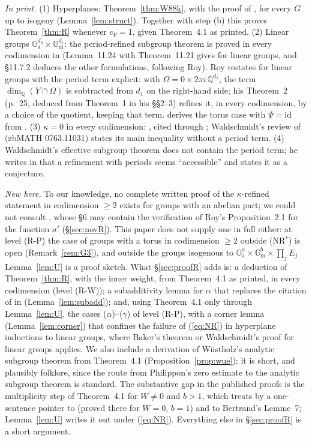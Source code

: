 \documentclass[11pt]{amsart}
\theoremstyle{definition}
\newcommand{\Q}{\mathbb{Q}}
\newcommand{\Ga}{\mathbb{G}_{\mathrm a}}
\newcommand{\Gm}{\mathbb{G}_{\mathrm m}}
\begin{document}
\emph{In print.} (1) Hyperplanes: Theorem~\ref{thm:W88k}, with the proof of \cite[\S5d]{W88}, for every $G$ up to isogeny
(Lemma~\ref{lem:struct}). Together with step (b) this proves Theorem~\ref{thm:R} whenever $c_V=1$, given Theorem~4.1 as
printed. (2) Linear groups $\Ga^{d_0}\times\Gm^{d_1}$: the period-refined subgroup theorem is proved in every codimension in
\cite[\S11.7.3]{W00} (Lemma~11.24 with Theorem~11.21 gives \cite[Thm.~4.1]{W88} for linear groups, and \S11.7.2 deduces the
other formulations, following Roy). Roy \cite[Thm.~1, p.~25]{Roy92} restates \cite[Thm.~4.1]{W88} for linear groups with
the period term explicit: with $\Omega=0\times2\pi i\,\Q^{d_1}$, the term $\dim_\Q(Y\cap\Omega)$ is subtracted from $d_1$ on
the right-hand side; his Theorem~2 (p.~25, deduced from Theorem~1 in his \S\S2--3) refines it, in every codimension, by a
choice of the quotient, keeping that term. \cite[Remarque 3]{RW93} derives the torus case with $\Psi=\mathrm{id}$ from
\cite[Thm.~5]{Roy92}. (3) $\kappa=0$ in every codimension: \cite[\S6, remarque
(i)]{R1}, cited through \cite[Remarque 2]{RW93}; Waldschmidt's review of \cite{R1} (zbMATH 0763.11031) states its main
inequality without a period term. (4) Waldschmidt's effective subgroup theorem \cite{W97} does not contain the period term;
he writes in \cite[\S7(f)]{W97} that a refinement with periods seems ``accessible'' and states it as a conjecture.

\emph{New here.} To our knowledge, no complete written proof of the $\kappa$-refined statement in codimension $\ge2$ exists
for groups with an abelian part; we could not consult \cite{R1}, whose \S6 may contain the verification of Roy's
Proposition~2.1 for the function $a'$ (\S\ref{sec:novR}). This paper does not supply one in full either: at level (R-P)
the case of groups with a torus in codimension $\ge2$ outside (NR$^*$) is open (Remark~\ref{rem:G3}), and outside the
groups isogenous to $\Ga^a\times\Gm^b\times\prod_jE_j$ Lemma~\ref{lem:U} is a proof sketch. What \S\ref{sec:proofR} adds
is: a deduction of Theorem~\ref{thm:R}, with the inner weight, from Theorem~4.1 as printed, in every codimension (level
(R-W)); a subadditivity lemma for $\alpha$ that replaces the citation of \cite[Lemme~4.3]{R1} in \cite[p.~359]{RW93}
(Lemma~\ref{lem:subadd}); and, using Theorem~4.1 only through Lemma~\ref{lem:U}, the cases ($\alpha$)--($\gamma$) of
level (R-P), with a corner lemma (Lemma~\ref{lem:corner}) that confines the failure of (\ref{eq:NR}) in hyperplane
inductions to linear groups, where Baker's theorem or Waldschmidt's proof for linear groups applies. We also include a
derivation of W\"ustholz's analytic subgroup theorem from Theorem~4.1 (Proposition~\ref{prop:wue}); it is short, and
plausibly folklore, since the route from Philippon's zero estimate to the analytic subgroup theorem is standard. The substantive gap
in the published proofs is the multiplicity step of Theorem~4.1 for $W\ne0$ and $b>1$, which \cite[p.~396]{W88} treats by a
one-sentence pointer to \cite[Prop.~2.4]{W83} (proved there for $W=0$, $b=1$) and to Bertrand's Lemme~7; Lemma~\ref{lem:U}
writes it out under (\ref{eq:NR}). Everything else in \S\ref{sec:proofR} is a short argument.
\end{document}
